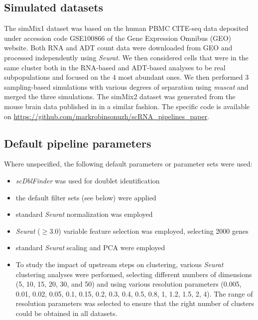 \documentclass{bmcart}
\begin{document}
\subsection*{Simulated datasets}
The simMix1 dataset was based on the human PBMC CITE-seq data deposited under accession code GSE100866 of the Gene Expression Omnibus (GEO) website. Both RNA and ADT count data were downloaded from GEO and processed independently using \textit{Seurat}. We then considered cells that were in the same cluster both in the RNA-based and ADT-based analyses to be real subpopulations and focused on the 4 most abundant ones. We then performed 3 sampling-based simulations with various degrees of separation using \textit{muscat} \cite{CrowellMuscat2019} and merged the three simulations. The simMix2 dataset was generated from the mouse brain data published in \cite{CrowellMuscat2019} in a similar fashion. The specific code is available on \url{https://github.com/markrobinsonuzh/scRNA\_pipelines\_paper}.

\subsection*{Default pipeline parameters}

Where unspecified, the following default parameters or parameter sets were used:
\begin{itemize}
    \item \textit{scDblFinder} was used for doublet identification
    \item the default filter sets (see below) were applied
    \item standard \textit{Seurat} normalization was employed
    \item \textit{Seurat} ($\geq$3.0) variable feature selection was employed, selecting 2000 genes
    \item standard \textit{Seurat} scaling and PCA were employed
    \item To study the impact of upstream steps on clustering, various \textit{Seurat} clustering analyses were performed, selecting different numbers of dimensions (5, 10, 15, 20, 30, and 50) and using various resolution parameters (0.005, 0.01, 0.02, 0.05, 0.1, 0.15, 0.2, 0.3, 0.4, 0.5, 0.8, 1, 1.2, 1.5, 2, 4). The range of resolution parameters was selected to ensure that the right number of clusters could be obtained in all datasets.
\end{itemize}
\end{document}
